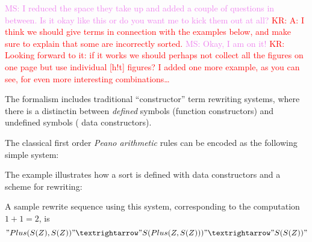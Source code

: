 \documentclass[letterpaper,11pt]{article}
\newcommand{\KR}[1]{\textcolor{red}{KR: #1}}
\newcommand{\MS}[1]{\textcolor{violet}{MS: #1}}
\begin{document}
\MS{I reduced the space they take up and added a couple of questions in between. Is it okay like
  this or do you want me to kick them out at all?}  \KR{A: I think we should give terms in
  connection with the examples below, and make sure to explain that some are incorrectly sorted.}
\MS{Okay, I am on it!} \KR{Looking forward to it: if it works we should perhaps not collect all the
  figures on one page but use individual [h!t] figures? I added one more example, as you can see, for
even more interesting combinations…}

The \hax formalism includes traditional ``constructor'' term rewriting systems, where there is a
distinctin between \emph{defined} symbols (\hax function constructors) and undefined symbols (\hax
data constructors).

\begin{example}\label{ex:peano}
  The classical first order \emph{Peano arithmetic} rules can be encoded as the following simple
  \hax system:
  The example illustrates how a sort is defined with data constructors and a scheme for
  rewriting:
  A sample rewrite sequence using this system, corresponding to the computation $1+1=2$, is
  \begin{displaymath}
    "Plus(S(Z), S(Z))" →
    "S(Plus(Z, S(Z)))" →
    "S(S(Z))"
  \end{displaymath}
\end{example}
\end{document}
